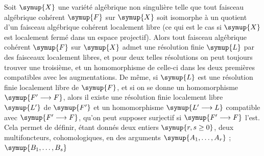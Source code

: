 Soit $\symup{X}$ une variété algébrique non singulière telle que tout faisceau
algébrique cohérent $\symup{F}$ sur $\symup{X}$ soit isomorphe à un quotient d'un faisceau
algébrique cohérent localement libre (ce qui est le cas si $\symup{X}$ est localement
fermé dans un espace projectif). Alors tout faisceau algébrique cohérent $\symup{F}$ sur
$\symup{X}$ admet une résolution finie $\symup{L}$ par des faisceaux localement libres, et pour
deux telles résolutions on peut toujours trouver une troisième, et un
homomorphisme de celle-ci dans les deux premières compatibles avec les
augmentations. De même, si $\symup{L}$ est une résolution finie localement libre de
$\symup{F}$, et si on se donne un homomorphisme $\symup{F'\longrightarrow F}$, alors il existe
une résolution finie localement libre $\symup{L'}$ de $\symup{F'}$ et un homomorphisme
$\symup{L'\longrightarrow L}$ compatible avec $\symup{F'\longrightarrow F}$, qu'on peut
supposer surjectif si $\symup{F'\longrightarrow F}$ l'est. Cela permet de définir, étant
donnés deux entiers $\symup{r,s\geq0}$, deux multifoncteurs, cohomologiques, en des
arguments $\symup{A_1,\ldots,A_r}$ ; $\symup{B_1,\ldots,B_s}$

